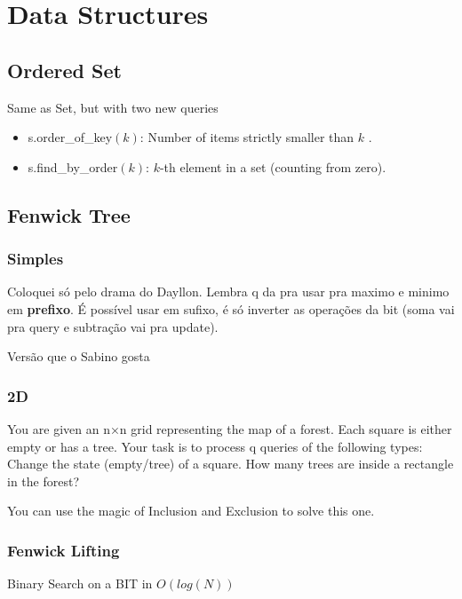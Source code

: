 \chapter{Data Structures}
    
    \section{Ordered Set}
    Same as Set, but with two new queries
    \begin{itemize}
        \item s.order\_of\_key$(k)$: Number of items strictly smaller than $k$ .
        \item s.find\_by\_order$(k)$: $k$-th element in a set (counting from zero).
    \end{itemize}
    
    
    
    \bigskip
    \section{Fenwick Tree}
    \subsection{Simples}

    Coloquei só pelo drama do Dayllon.
    Lembra q da pra usar pra maximo e minimo em \textbf{prefixo}. É possível usar em sufixo, é só inverter as operações da bit (soma vai pra query e subtração vai pra update).

    

    Versão que o Sabino gosta

    
    
    \subsection{2D}
    You are given an n×n grid representing the map of a forest. Each square is either empty or has a tree. Your task is to process q queries of the following types:
    Change the state (empty/tree) of a square.
    How many trees are inside a rectangle in the forest?

    You can use the magic of Inclusion and Exclusion to solve this one.
    
    \subsection{Fenwick Lifting}
    Binary Search on a BIT in $O(log(N))$
    
